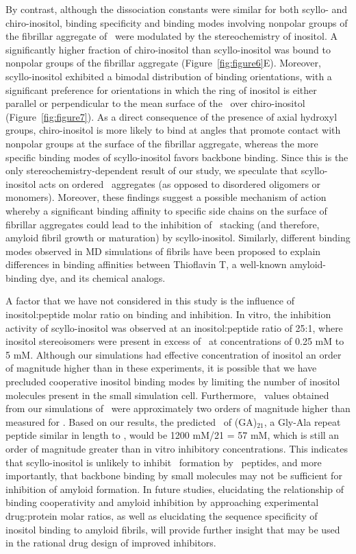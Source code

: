 By contrast, although the dissociation constants were similar for both scyllo- and chiro-inositol, binding specificity and binding modes involving nonpolar groups of the fibrillar aggregate of \gafour\ were modulated by the stereochemistry of inositol. A significantly higher fraction of chiro-inositol than scyllo-inositol was bound to nonpolar groups of the fibrillar aggregate (Figure~\ref{fig:figure6}E). Moreover, scyllo-inositol exhibited a bimodal distribution of binding orientations, with a significant preference for orientations in which the ring of inositol is either parallel or perpendicular to the mean surface of the \bsheet\ over chiro-inositol (Figure~\ref{fig:figure7}). As a direct consequence of the presence of axial hydroxyl groups, chiro-inositol is more likely to bind at angles that promote contact with nonpolar groups at the surface of the fibrillar aggregate, whereas the more specific binding modes of scyllo-inositol favors backbone binding. Since this is the only stereochemistry-dependent result of our study, we speculate that scyllo-inositol acts on ordered \bsheet\ aggregates (as opposed to disordered oligomers or monomers). Moreover, these findings suggest a possible mechanism of action whereby a significant binding affinity to specific side chains on the surface of fibrillar aggregates could lead to the inhibition of \bsheet\ stacking (and therefore, amyloid fibril growth or maturation) by scyllo-inositol. Similarly, different binding modes observed in MD simulations of  fibrils have been proposed to explain differences in binding affinities between Thioflavin T, a well-known amyloid-binding dye, and its chemical analogs.\cite{Mathis:2003p55,Wu:2011p24}

A factor that we have not considered in this study is the influence of inositol:peptide molar ratio on binding and inhibition. In vitro, the inhibition activity of scyllo-inositol was observed at an inositol:peptide ratio of 25:1, where inositol stereoisomers were present in excess of \abeta\ at concentrations of 0.25 mM to 5 mM.\cite{McLaurin:2000p64} Although our simulations had effective concentration of inositol an order of magnitude higher than in these experiments, it is possible that we have precluded cooperative inositol binding modes by limiting the number of inositol molecules present in the small simulation cell. Furthermore, \KD\ values obtained from our simulations of \gafour\ were approximately two orders of magnitude higher than measured for \abeta. Based on our results, the predicted \KD\ of (GA)$_21$, a Gly-Ala repeat peptide similar in length to \abeta, would be 1200 mM/21 = 57 mM, which is still an order of magnitude greater than in vitro inhibitory concentrations. This indicates that scyllo-inositol is unlikely to inhibit \bsheet\ formation by \gafour\ peptides, and more importantly, that backbone binding by small molecules may not be sufficient for inhibition of amyloid formation. In future studies, elucidating the relationship of binding cooperativity and amyloid inhibition by approaching experimental drug:protein molar ratios, as well as elucidating the sequence specificity of inositol binding to amyloid fibrils, will provide further insight that may be used in the rational drug design of improved inhibitors.

